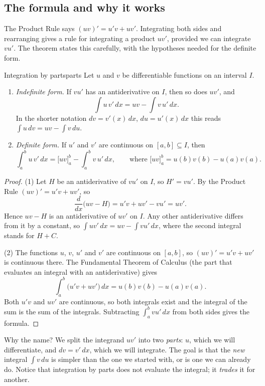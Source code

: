 \documentclass[11pt]{article}
\begin{document}
\subsection*{The formula and why it works}

The Product Rule says $(uv)'=u'v+uv'$. Integrating both sides and rearranging gives a rule for integrating a product $uv'$, provided we can integrate $vu'$. The theorem states this carefully, with the hypotheses needed for the definite form.

\begin{thm}{Integration by parts}{parts}
Let $u$ and $v$ be differentiable functions on an interval $I$.
\begin{enumerate}[label=(\arabic*)]
  \item \emph{Indefinite form.} If $vu'$ has an antiderivative on $I$, then so does $uv'$, and
  \[\int u\,v'\,dx=uv-\int v\,u'\,dx .\]
  In the shorter notation $dv=v'(x)\,dx$, $du=u'(x)\,dx$ this reads $\displaystyle\int u\,dv=uv-\int v\,du$.
  \item \emph{Definite form.} If $u'$ and $v'$ are continuous on $[a,b]\subseteq I$, then
  \[\int_a^bu\,v'\,dx=\Big[uv\Big]_a^b-\int_a^bv\,u'\,dx,\qquad\text{where }\Big[uv\Big]_a^b=u(b)v(b)-u(a)v(a).\]
\end{enumerate}
\end{thm}
\begin{proof}
(1) Let $H$ be an antiderivative of $vu'$ on $I$, so $H'=vu'$. By the Product Rule $(uv)'=u'v+uv'$, so
\[\frac{d}{dx}\big(uv-H\big)=u'v+uv'-vu'=uv' .\]
Hence $uv-H$ is an antiderivative of $uv'$ on $I$. Any other antiderivative differs from it by a constant, so $\int uv'\,dx=uv-\int vu'\,dx$, where the second integral stands for $H+C$.

(2) The functions $u$, $v$, $u'$ and $v'$ are continuous on $[a,b]$, so $(uv)'=u'v+uv'$ is continuous there. The Fundamental Theorem of Calculus (the part that evaluates an integral with an antiderivative) gives
\[\int_a^b\big(u'v+uv'\big)\,dx=u(b)v(b)-u(a)v(a).\]
Both $u'v$ and $uv'$ are continuous, so both integrals exist and the integral of the sum is the sum of the integrals. Subtracting $\int_a^bvu'\,dx$ from both sides gives the formula.
\end{proof}

Why the name? We split the integrand $uv'$ into two \emph{parts}: $u$, which we will differentiate, and $dv=v'\,dx$, which we will integrate. The goal is that the \emph{new} integral $\int v\,du$ is simpler than the one we started with, or is one we can already do. Notice that integration by parts does not evaluate the integral; it \emph{trades} it for another.
\end{document}
